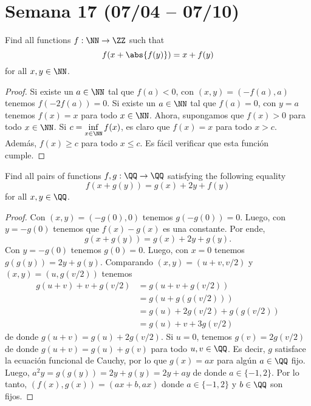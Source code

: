 \section{Semana 17 (07/04 -- 07/10)}


\begin{probEG}[Azerbaijan]
	Find all functions $f:\NN\to\ZZ$ such that
	\[f(x+\abs{f(y)})=x+f(y)\]
	for all $x,y\in\NN$.
\end{probEG}

\begin{proof}
	Si existe un $a\in\NN$ tal que $f(a)<0$, con $(x,y)=(-f(a),a)$ tenemos $f(-2f(a))=0$. Si existe un $a\in\NN$ tal que $f(a)=0$, con $y=a$ tenemos $f(x)=x$ para todo $x\in\NN$. Ahora, supongamos que $f(x)>0$ para todo $x\in\NN$. Si $\displaystyle c=\inf_{x\in\NN}f(x)$, es claro que $f(x)=x$ para todo $x>c$. Además, $f(x)\ge c$ para todo $x\le c$. Es fácil verificar que esta función cumple.
\end{proof}

\begin{probEG}
	Find all pairs of functions $f,g:\QQ\to\QQ$ satisfying the following equality
	\[f(x+g(y))=g(x)+2y+f(y)\]
	for all $x,y\in\QQ$.
\end{probEG}

\begin{proof}
	Con $(x,y)=(-g(0),0)$ tenemos $g(-g(0))=0$. Luego, con $y=-g(0)$ tenemos que $f(x)-g(x)$ es una constante. Por ende,
	\[g(x+g(y))=g(x)+2y+g(y).\]
	Con $y=-g(0)$ tenemos $g(0)=0$. Luego, con $x=0$ tenemos $g(g(y))=2y+g(y)$. Comparando $(x,y)=(u+v,v/2)$ y $(x,y)=(u,g(v/2))$ tenemos
	\begin{align*}
		g(u+v)+v+g(v/2)
		&=g(u+v+g(v/2))\\
		&=g(u+g(g(v/2)))\\
		&=g(u)+2g(v/2)+g(g(v/2))\\
		&=g(u)+v+3g(v/2)
	\end{align*}
	de donde $g(u+v)=g(u)+2g(v/2)$. Si $u=0$, tenemos $g(v)=2g(v/2)$ de donde $g(u+v)=g(u)+g(v)$ para todo $u,v\in\QQ$. Es decir, $g$ satisface la ecuación funcional de Cauchy, por lo que $g(x)=ax$ para algún $a\in\QQ$ fijo. Luego, $a^2y=g(g(y))=2y+g(y)=2y+ay$ de donde $a\in\{-1,2\}$. Por lo tanto, $(f(x),g(x))=(ax+b,ax)$ donde $a\in\{-1,2\}$ y $b\in\QQ$ son fijos.
\end{proof}

